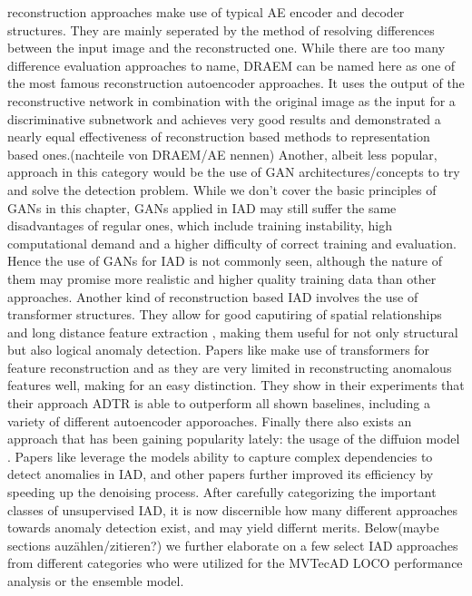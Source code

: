 reconstruction approaches make use of typical AE encoder and decoder structures. They are mainly seperated by the method of resolving differences between the input image and the reconstructed one. 
While there are too many difference evaluation approaches to name, DRAEM \cite{Zavrtanik_2021DRAEM} can be named here as one of the most famous reconstruction autoencoder approaches. It uses 
the output of the reconstructive network in combination with the original image as the input for a discriminative subnetwork and achieves very good results and demonstrated a nearly equal effectiveness 
of reconstruction based methods to representation based ones.(nachteile von DRAEM/AE nennen)
Another, albeit less popular, approach in this category would be the use of GAN architectures/concepts to try and solve the detection problem. While we don't cover the basic principles of GANs in 
this chapter, GANs applied in IAD may still suffer the same disadvantages of regular ones, which include training instability, high computational demand and a higher difficulty of correct training and 
evaluation. Hence the use of GANs for IAD is not commonly seen, although the nature of them may promise more realistic and higher quality training data than other approaches.
Another kind of reconstruction based IAD involves the use of transformer structures. They allow for good caputiring of spatial relationships and long distance feature extraction \cite{xie2020benchmarking},
making them useful for not only structural but also logical anomaly detection. Papers like \cite{You_2023transformer} make use of transformers for feature reconstruction and as they are very 
limited in reconstructing anomalous features well, making for an easy distinction. They show in their experiments that their approach ADTR is able to outperform all shown baselines, including 
a variety of different autoencoder apporoaches.
Finally there also exists an approach that has been gaining popularity lately: the usage of the diffuion model \cite{ho2020denoisingdiffusionOG}. Papers like \cite{Wyatt_2022diffusionfirstapproach} 
leverage the models ability to capture complex dependencies to detect anomalies in IAD, and other papers \cite{zhang2023diffusionaddiffusionmodern} further improved its efficiency by speeding up 
the denoising process.
\newline
After carefully categorizing the important classes of unsupervised IAD, it is now discernible how many different approaches towards anomaly detection exist, and may yield differnt merits. 
Below(maybe sections auzählen/zitieren?) we further elaborate on a few select IAD approaches from different categories who were utilized for the MVTecAD LOCO performance analysis or the ensemble 
model. 



